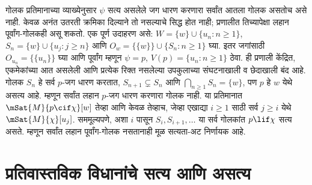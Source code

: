 गोलक प्रतिमानाच्या व्याख्येनुसार $\psi$ सत्य असलेले
जग धारण करणारा सर्वांत आतला गोलक असतोच असे नाही.
केवळ अनंत उतरती क्रमिका दिल्याने तो नसल्याचे सिद्ध होत नाही;
प्रणालीत तिच्यापेक्षा लहान पूर्वांग-गोलकही असू शकतो.
एक पूर्ण उदाहरण असे: $W=\{w\}\cup\{u_n:n\geq1\}$,
$S_n=\{w\}\cup\{u_j:j\geq n\}$ आणि
$O_w=\{\{w\}\}\cup\{S_n:n\geq1\}$ घ्या.
इतर जगांसाठी $O_{u_n}=\{\{u_n\}\}$ घ्या आणि
पूर्वांग म्हणून $\psi=p$, $V(p)=\{u_n:n\geq1\}$ ठेवा.
ही प्रणाली केंद्रित, एकमेकांच्या आत असलेली आणि प्रत्येक
रिक्त नसलेल्या उपकुलाच्या संघटनाखाली व छेदाखाली बंद आहे.
गोलक $S_n$ हे सर्व $p$-जग धारण करतात,
$S_{n+1}\subsetneq S_n$ आणि $\bigcap_{n\geq1}S_n=\{w\}$,
पण $p$ हे $w$ येथे असत्य आहे. म्हणून सर्वांत लहान
$p$-जग धारण करणारा गोलक नाही.
या प्रतिमानात $\mSat{M}{p\cif \chi}[w]$ तेव्हा आणि केवळ तेव्हाच,
जेव्हा एखाद्या $i\geq1$ साठी सर्व $j\geq i$ येथे
$\mSat{M}{\chi}[u_j]$. सममूल्यपणे, अशा $i$ पासून
$S_i,S_{i+1},\dots$ या सर्व गोलकांत $p\lif \chi$ सत्य असते.
म्हणून सर्वांत लहान पूर्वांग-गोलक नसतानाही मूळ सत्यता-अट
निर्णायक आहे.













\section{प्रतिवास्तविक विधानांचे सत्य आणि असत्य}\label{con:min:tf:sec}

